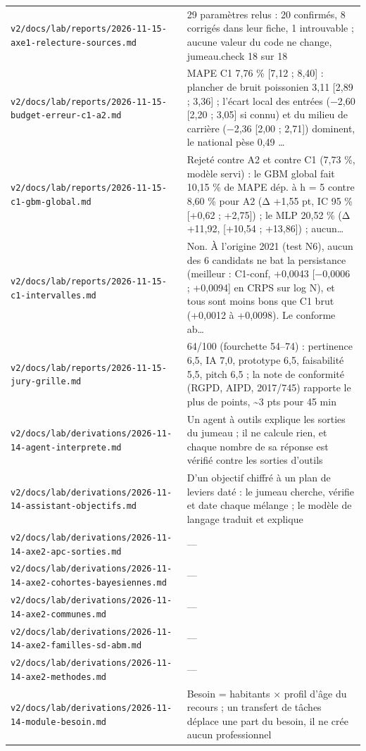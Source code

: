 \begin{small}
\begin{longtable}{@{}p{}p{}@{}}
\texttt{v2/docs/lab/reports/2026-11-15-axe1-relecture-sources.md} & 29 paramètres relus : 20 confirmés, 8 corrigés dans leur fiche, 1 introuvable ; aucune valeur du code ne change, jumeau.check 18 sur 18 \\
\texttt{v2/docs/lab/reports/2026-11-15-budget-erreur-c1-a2.md} & MAPE C1 7,76 \% [7,12 ; 8,40] : plancher de bruit poissonien 3,11 [2,89 ; 3,36] ; l'écart local des entrées (−2,60 [2,20 ; 3,05] si connu) et du milieu de carrière (−2,36 [2,00 ; 2,71]) dominent, le national pèse 0,49 … \\
\texttt{v2/docs/lab/reports/2026-11-15-c1-gbm-global.md} & Rejeté contre A2 et contre C1 (7,73 \%, modèle servi) : le GBM global fait 10,15 \% de MAPE dép. à h = 5 contre 8,60 \% pour A2 (Δ +1,55 pt, IC 95 \% [+0,62 ; +2,75]) ; le MLP 20,52 \% (Δ +11,92, [+10,54 ; +13,86]) ; aucun… \\
\texttt{v2/docs/lab/reports/2026-11-15-c1-intervalles.md} & Non. À l'origine 2021 (test N6), aucun des 6 candidats ne bat la persistance (meilleur : C1-conf, +0,0043 [−0,0006 ; +0,0094] en CRPS sur log N), et tous sont moins bons que C1 brut (+0,0012 à +0,0098). Le conforme ab… \\
\texttt{v2/docs/lab/reports/2026-11-15-jury-grille.md} & 64/100 (fourchette 54–74) : pertinence 6,5, IA 7,0, prototype 6,5, faisabilité 5,5, pitch 6,5 ; la note de conformité (RGPD, AIPD, 2017/745) rapporte le plus de points, \textasciitilde{}3 pts pour 45 min \\
\texttt{v2/docs/lab/derivations/2026-11-14-agent-interprete.md} & Un agent à outils explique les sorties du jumeau ; il ne calcule rien, et chaque nombre de sa réponse est vérifié contre les sorties d'outils \\
\texttt{v2/docs/lab/derivations/2026-11-14-assistant-objectifs.md} & D'un objectif chiffré à un plan de leviers daté : le jumeau cherche, vérifie et date chaque mélange ; le modèle de langage traduit et explique \\
\texttt{v2/docs/lab/derivations/2026-11-14-axe2-apc-sorties.md} & — \\
\texttt{v2/docs/lab/derivations/2026-11-14-axe2-cohortes-bayesiennes.md} & — \\
\texttt{v2/docs/lab/derivations/2026-11-14-axe2-communes.md} & — \\
\texttt{v2/docs/lab/derivations/2026-11-14-axe2-familles-sd-abm.md} & — \\
\texttt{v2/docs/lab/derivations/2026-11-14-axe2-methodes.md} & — \\
\texttt{v2/docs/lab/derivations/2026-11-14-module-besoin.md} & Besoin = habitants × profil d'âge du recours ; un transfert de tâches déplace une part du besoin, il ne crée aucun professionnel \\

\end{longtable}
\end{small}
